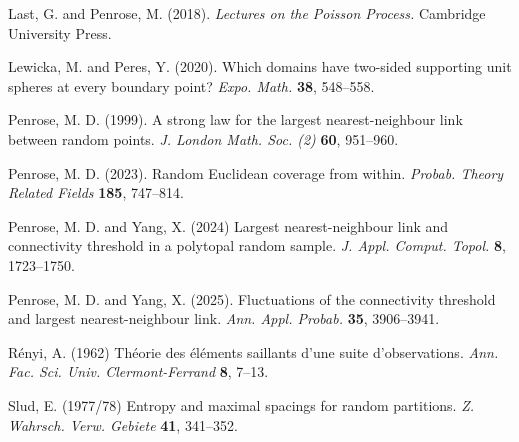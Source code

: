 \documentclass[12pt]{article}
\begin{document}
\begin{thebibliography}{}
Last, G. and Penrose, M. (2018). {\em Lectures on the Poisson Process.}
Cambridge University Press.


         Lewicka, M.  and Peres, Y.
(2020).
Which domains have two-sided supporting unit spheres at every boundary point?
{\em Expo. Math.}   {\bf 38},
548--558.




Penrose, M. D. (1999).
A strong law for the largest nearest-neighbour link between random points.
{\em J. London Math. Soc. (2)} {\bf 60}, 951--960.


Penrose, M. D.  (2023).
Random Euclidean coverage from within.
{\em Probab. Theory Related Fields} {\bf 185},
747--814.

Penrose, M. D. and Yang, X. (2024)
Largest nearest-neighbour link and connectivity threshold in a polytopal random sample.
{\em J. Appl. Comput. Topol.} {\bf 8},
1723--1750.

	Penrose, M. D. and  Yang, X.  (2025).
Fluctuations of the connectivity threshold and largest nearest-neighbour link.
{\em Ann. Appl. Probab.} {\bf 35},
3906--3941.


 

R\'{e}nyi, A.  (1962)
Th\'{e}orie des \'{e}l\'{e}ments saillants d'une suite d'observations.
{\em Ann. Fac. Sci. Univ. Clermont-Ferrand } {\bf 8}, 7--13. 



	Slud, E. (1977/78)
Entropy and maximal spacings for random partitions.
{\em Z. Wahrsch. Verw. Gebiete}
{\bf 41}, %
341--352.

\end{thebibliography}
\end{document}
